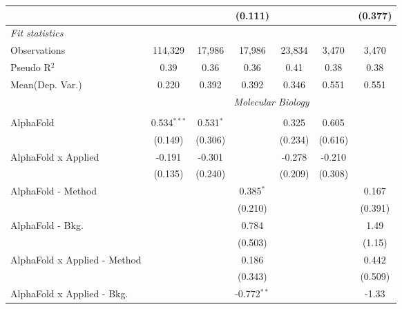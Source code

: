 \begin{tabular}{lcccccc}
                                  &                &               & (0.111)       &                &               & (0.377)\\   
   \midrule
   \emph{Fit statistics}\\
   Observations                   & 114,329        & 17,986        & 17,986        & 23,834         & 3,470         & 3,470\\  
   Pseudo R$^2$                   & 0.39           & 0.36          & 0.36          & 0.41           & 0.38          & 0.38\\  
Mean(Dep. Var.) & 0.220 & 0.392 & 0.392 & 0.346 & 0.551 & 0.551 \\
   
 & \multicolumn{6}{c}{\textit{Molecular Biology}} \\ \\
   AlphaFold                      & 0.534$^{***}$ & 0.531$^{*}$   &               & 0.325        & 0.605   &   \\   
                                  & (0.149)       & (0.306)       &               & (0.234)      & (0.616) &   \\   
   AlphaFold x Applied            & -0.191        & -0.301        &               & -0.278       & -0.210  &   \\   
                                  & (0.135)       & (0.240)       &               & (0.209)      & (0.308) &   \\   
   AlphaFold - Method             &               &               & 0.385$^{*}$   &              &         & 0.167\\   
                                  &               &               & (0.210)       &              &         & (0.391)\\   
   AlphaFold - Bkg.               &               &               & 0.784         &              &         & 1.49\\   
                                  &               &               & (0.503)       &              &         & (1.15)\\   
   AlphaFold x Applied - Method   &               &               & 0.186         &              &         & 0.442\\   
                                  &               &               & (0.343)       &              &         & (0.509)\\   
   AlphaFold x Applied - Bkg.     &               &               & -0.772$^{**}$ &              &         & -1.33\\   

\end{tabular}
